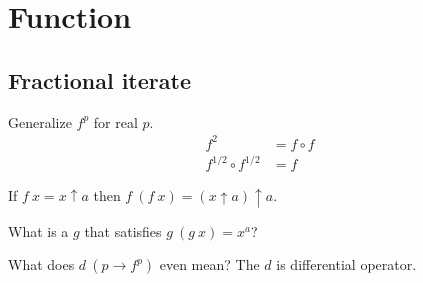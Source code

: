\chapter{Function}

\section{Fractional iterate}

Generalize \(f^p\) for real \(p\).
\begin{align*}
    f^2 &= f \circ f
    \\
    f^{1/2} \circ f^{1/2} &= f
\end{align*}

If \(f~x = x \uparrow a\) then \(f~(f~x) = (x \uparrow a) \uparrow a\).

What is a \(g\) that satisfies \(g~(g~x) = x^a\)?

What does \(d~(p \to f^p)\) even mean?
The \(d\) is differential operator.



